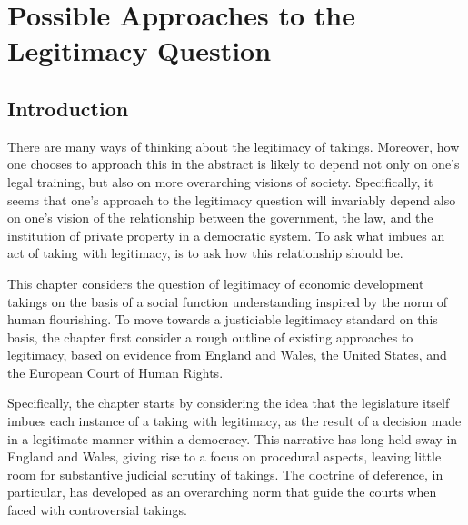 
\chapter{Possible Approaches to the Legitimacy Question}\label{chap:3}

\section{Introduction}\label{sec:3:1}


There are many ways of thinking about the legitimacy of takings. Moreover, how one chooses to approach this in the abstract is likely to depend not only on one's legal training, but also on more overarching visions of society. Specifically, it seems that one's approach to the legitimacy question will invariably depend also on one's vision of the relationship between the government, the law, and the institution of private property in a democratic system. To ask what imbues an act of taking with legitimacy, is to ask how this relationship should be.

This chapter considers the question of legitimacy of economic development takings on the basis of a social function understanding inspired by the norm of human flourishing. To move towards a justiciable legitimacy standard on this basis, the chapter first consider a rough outline of existing approaches to legitimacy, based on evidence from England and Wales, the United States, and the European Court of Human Rights.

Specifically, the chapter starts by considering the idea that the legislature itself imbues each instance of a taking with legitimacy, as the result of a decision made in a legitimate manner within a democracy. This narrative has long held sway in England and Wales, giving rise to a focus on procedural aspects, leaving little room for substantive judicial scrutiny of takings. The doctrine of deference, in particular, has developed as an overarching norm that guide the courts when faced with controversial takings. %

